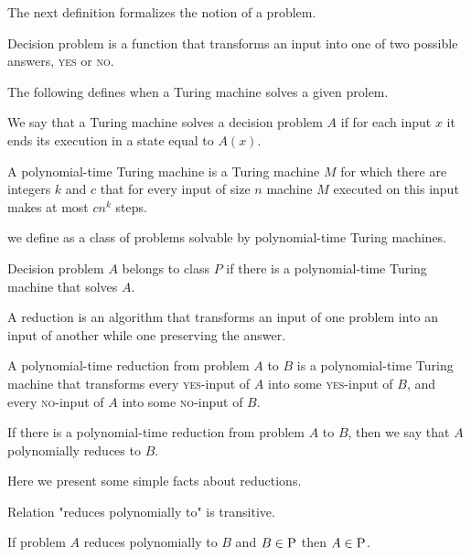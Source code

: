 The next definition formalizes the notion of a problem.

\begin{defn}
Decision problem is a function that transforms an input into one of two possible answers,
\textsc{yes} or \textsc{no}.
\end{defn}

The following defines when a Turing machine solves a given prolem.

\begin{defn}
We say that a Turing machine solves a decision problem $A$ if for each input $x$
it ends its execution in a state equal to $A(x)$.
\end{defn}

\begin{defn}
A polynomial-time Turing machine is a Turing machine $M$ for which there are integers $k$ and $c$
that for every input of size $n$ machine $M$ executed on this input makes at most $c n^k$ steps.
\end{defn}

we define \p as a class of problems solvable by polynomial-time Turing machines.

\begin{defn}[class \p]
Decision problem $A$ belongs to class $P$ if there is a polynomial-time Turing machine that solves $A$.
\end{defn}

A reduction is an algorithm that transforms an input of one problem
into an input of another while one preserving the answer.

\begin{defn}
A polynomial-time reduction from problem $A$ to $B$ is a polynomial-time Turing machine
that transforms every \textsc{yes}-input of $A$ into some \textsc{yes}-input of $B$,
and every \textsc{no}-input of $A$ into some \textsc{no}-input of $B$.
\end{defn}

If there is a polynomial-time reduction from problem $A$ to $B$,
then we say that $A$ polynomially reduces to $B$.

Here we present some simple facts about reductions.

\begin{rmrk}\label{tran-red}
Relation "reduces polynomially to" is transitive.
\end{rmrk}

\begin{rmrk}\label{p-red}
If problem $A$ reduces polynomially to $B$ and $B \in \text{\textsc{P}}$ then $A \in \text{\textsc{P}}$.
\end{rmrk}

